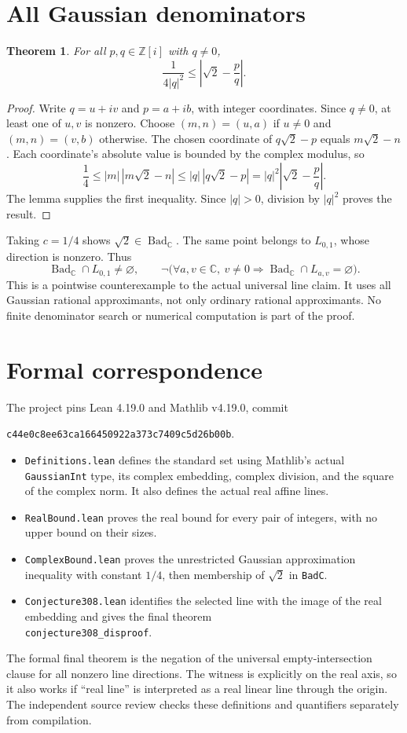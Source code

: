 \documentclass[11pt]{article}
\newtheorem{theorem}{Theorem}
\newcommand{\C}{\mathbb C}
\newcommand{\Z}{\mathbb Z}
\newcommand{\Bad}{\operatorname{Bad}_{\C}}
\begin{document}
\section{All Gaussian denominators}
\begin{theorem}
For all $p,q\in\Z[i]$ with $q\ne0$,
\[
 \frac{1}{4|q|^2}\le\left|\sqrt2-\frac pq\right|.
\]
\end{theorem}
\begin{proof}
Write $q=u+iv$ and $p=a+ib$, with integer coordinates. Since $q\ne0$, at least one of $u,v$ is nonzero. Choose $(m,n)=(u,a)$ if $u\ne0$ and $(m,n)=(v,b)$ otherwise. The chosen coordinate of $q\sqrt2-p$ equals $m\sqrt2-n$. Each coordinate's absolute value is bounded by the complex modulus, so
\[
 \frac14\le |m|\,|m\sqrt2-n|
 \le |q|\,|q\sqrt2-p|
 =|q|^2\left|\sqrt2-\frac pq\right|.
\]
The lemma supplies the first inequality. Since $|q|>0$, division by $|q|^2$ proves the result.
\end{proof}
Taking $c=1/4$ shows $\sqrt2\in\Bad$. The same point belongs to $L_{0,1}$, whose direction is nonzero. Thus
\[
 \Bad\cap L_{0,1}\ne\varnothing,
 \qquad
 \neg\bigl(\forall a,v\in\C,\ v\ne0\Longrightarrow
                  \Bad\cap L_{a,v}=\varnothing\bigr).
\]
This is a pointwise counterexample to the actual universal line claim. It uses all Gaussian rational approximants, not only ordinary rational approximants. No finite denominator search or numerical computation is part of the proof.

\section{Formal correspondence}
The project pins Lean 4.19.0 and Mathlib v4.19.0, commit
\begin{center}\small\texttt{c44e0c8ee63ca166450922a373c7409c5d26b00b}.\end{center}
\begin{itemize}
\item \texttt{Definitions.lean} defines the standard set using Mathlib's actual \texttt{GaussianInt} type, its complex embedding, complex division, and the square of the complex norm. It also defines the actual real affine lines.
\item \texttt{RealBound.lean} proves the real bound for every pair of integers, with no upper bound on their sizes.
\item \texttt{ComplexBound.lean} proves the unrestricted Gaussian approximation inequality with constant $1/4$, then membership of $\sqrt2$ in \texttt{BadC}.
\item \texttt{Conjecture308.lean} identifies the selected line with the image of the real embedding and gives the final theorem\\
\texttt{conjecture308\_disproof}.
\end{itemize}
The formal final theorem is the negation of the universal empty-intersection clause for all nonzero line directions. The witness is explicitly on the real axis, so it also works if ``real line'' is interpreted as a real linear line through the origin. The independent source review checks these definitions and quantifiers separately from compilation.
\newpage
\end{document}

